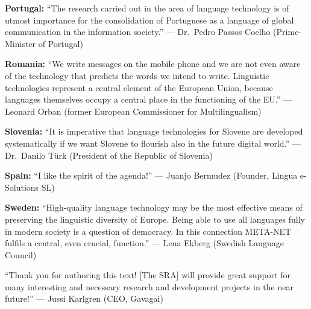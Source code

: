 \documentclass[10pt, plain]{../../metanetpaper}
\begin{document}
\medskip \textbf{Portugal:} ``The research carried out in the area of language technology is of utmost importance for the consolidation of Portuguese as a language of global communication in the information society.'' --- Dr.~Pedro Passos Coelho (Prime-Minister of Portugal)

\medskip \textbf{Romania:} ``We write messages on the mobile phone and we are not even aware of the technology that predicts the words we intend to write. Linguistic technologies represent a central element of the European Union, because languages themselves occupy a central place in the functioning of the EU.'' --- Leonard Orban (former European Commissioner for Multilingualism)

\medskip \textbf{Slovenia:} ``It is imperative that language technologies for Slovene are developed systematically if we want Slovene to flourish also in the future digital world.'' --- Dr.~Danilo Türk (President of the Republic of Slovenia)

\medskip \textbf{Spain:} ``I like the spirit of the agenda!'' --- Juanjo Bermudez (Founder, Lingua e-Solutions SL)

\medskip \textbf{Sweden:} ``High-quality language technology may be the most effective means of preserving the linguistic diversity of Europe. Being able to use all languages fully in modern society is a question of democracy. In this connection META-NET fulfils a central, even crucial, function.'' --- Lena Ekberg (Swedish Language Council)


\medskip ``Thank you for authoring this text! [The SRA] will provide great support for many interesting and necessary research and development projects in the near future!'' --- Jussi Karlgren (CEO, Gavagai)


\end{document}
